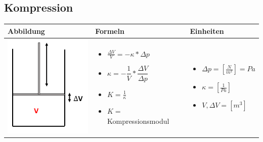 \subsection{Kompression}				%
\begin{table}[h!]
	\begin{tabular}{ | m{6cm} | m{6cm} | m{6cm} | }
		\hline
		Abbildung & Formeln & Einheiten \\ \hline
		\midrule
		\begin{minipage}{.3\textwidth}
			\includegraphics[width=4.5cm]{Figures/Kompression}
		\end{minipage}
		&
		\begin{itemize}
			\item $\frac{\Delta V}{V}=-\kappa * \Delta p$
			\item $\kappa = -\dfrac{1}{V}*\dfrac{\Delta V}{\Delta p}$
			\item {\color{red}$K=\frac{1}{\kappa}$} 
			\item {\color{red}$K=$Kompressionsmodul}
		\end{itemize}
		& 
		\begin{itemize}
			\item $\Delta p=[\frac{N}{m^2}]=Pa$
			\item $\kappa =[\frac{1}{Pa}]$
			\item $V, \Delta V =[m^3]$ 		
		\end{itemize}
		\\ \hline
	\end{tabular}
\end{table}


